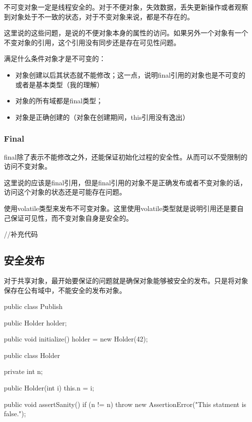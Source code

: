 不可变对象一定是线程安全的。对于不便对象，失效数据，丢失更新操作或者观察到对象处于不一致的状态，对于不变对象来说，都是不存在的。

这里说的这些问题，是说的不便对象本身的属性的访问。如果另外一个对象有一个不变对象的引用，这个引用没有同步还是存在可见性问题。

满足什么条件对象才是不可变的：
\begin{itemize}
\item 对象创建以后其状态就不能修改；这一点，说明final引用的对象也是不可变的或者是基本类型（我的理解）
\item 对象的所有域都是final类型；
\item 对象是正确创建的（对象在创建期间，this引用没有逸出）
\end{itemize}


\subsubsection{Final}

final除了表示不能修改之外，还能保证初始化过程的安全性。从而可以不受限制的访问不变对象。

这里说的应该是final引用，但是final引用的对象不是正确发布或者不变对象的话，访问这个对象的状态还是可能存在问题。


使用volatile类型来发布不可变对象。这里使用volatile类型就是说明引用还是要自己保证可见性，而不变对象自身是安全的。

\begin{Java}
//补充代码
\end{Java}

\subsection{安全发布}

对于共享对象，最开始要保证的问题就是确保对象能够被安全的发布。只是将对象保存在公有域中，不能安全的发布对象。

\begin{Java}
public class Publish {

	public Holder holder;
	
	public void initialize() {
		holder = new Holder(42);
	}
}

public class Holder {
	
	private int n;

	public Holder(int i) {
		this.n = i;
	}

	public void assertSanity() {
		if (n != n) {
			throw new AssertionError("This statment is false.");
		}
	}
}
\end{Java}

